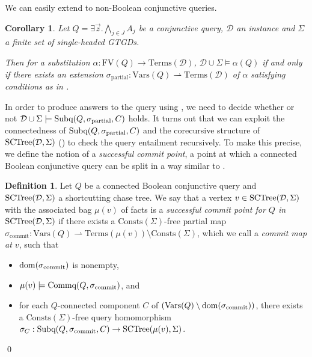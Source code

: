 \documentclass[12pt]{report}
\theoremstyle{plain}
\newtheorem{corollary}[theorem]{Corollary}
\theoremstyle{definition}
\newtheorem{definition}[theorem]{Definition}
\def\FV{{\mathrm{FV}}}
\def\Vars{{\mathrm{Vars}}}
\def\Consts{{\mathrm{Consts}}}
\def\Terms{{\mathrm{Terms}}}
\newcommand{\dom}[1]{\ensuremath{\normalfont{\operatorname{dom}}\!\left( #1 \right)}}
\newcommand{\SCTree}[2]{\ensuremath{\normalfont{\textrm{SCTree}}\!\left( #1, #2 \right)}}
\newcommand{\Subq}[3]{\ensuremath{\normalfont{\textrm{Subq}}\!\left( #1, #2, #3 \right)}}
\newcommand{\Commq}[2]{\ensuremath{\normalfont{\textrm{Commq}}\!\left( #1, #2 \right)}}
\begin{document}
We can easily extend  to non-Boolean conjunctive queries.

\begin{corollary}
\label{corollary:base-connected-query-decomposition}
  Let $Q = \exists \vec{z}. \bigwedge_{j \in J} A_j$ be a conjunctive query, $\mathcal{D}$ an instance and $\Sigma$ a finite set of single-headed GTGDs.
  
  Then for a substitution $\alpha: \FV(Q) \rightarrow \Terms(\mathcal{D})$, $\mathcal{D} \cup \Sigma \models \alpha(Q)$ if and only if there exists an extension $\sigma_{\mathrm{partial}}: \Vars(Q) \rightharpoonup \Terms(\mathcal{D})$ of $\alpha$ satisfying conditions as in .
\end{corollary}

In order to produce answers to the query using , we need to decide whether or not $\mathcal{D} \cup \Sigma \models \Subq{Q}{\sigma_{\mathrm{partial}}}{C}$ holds. It turns out that we can exploit the connectedness of $\Subq{Q}{\sigma_{\mathrm{partial}}}{C}$ and the corecursive structure of $\SCTree{\mathcal{D}}{\Sigma}$ () to check the query entailment recursively. To make this precise, we define the notion of a \emph{successful commit point}, a point at which a connected Boolean conjunctive query can be split in a way similar to .

\begin{definition}
\label{definition:successful-commit-point}
  Let $Q$ be a connected Boolean conjunctive query and $\SCTree{\mathcal{D}}{\Sigma}$ a shortcutting chase tree. We say that a vertex $v \in \SCTree{\mathcal{D}}{\Sigma}$ with the associated bag $\mu(v)$ of facts is a \emph{successful commit point for $Q$ in $\SCTree{\mathcal{D}}{\Sigma}$} if there exists a $\Consts(\Sigma)$-free partial map $\sigma_{\mathrm{commit}}: \Vars(Q) \rightharpoonup \Terms(\mu(v)) \setminus \Consts(\Sigma)$, which we call a \emph{commit map at $v$}, such that
  \begin{itemize}
    \item $\dom{\sigma_{\mathrm{commit}}}$ is nonempty,
    \item $\mu(v) \models \Commq{Q}{\sigma_{\mathrm{commit}}}$, and
    \item for each $Q$-connected component $C$ of $(\Vars(Q) \setminus \dom{\sigma_{\mathrm{commit}}})$, there exists a $\Consts(\Sigma)$-free query homomorphism $\sigma_C: \Subq{Q}{\sigma_{\mathrm{commit}}}{C} \rightarrow \SCTree{\mu(v)}{\Sigma}$.
  \end{itemize}
  \qed
\end{definition}
\end{document}
